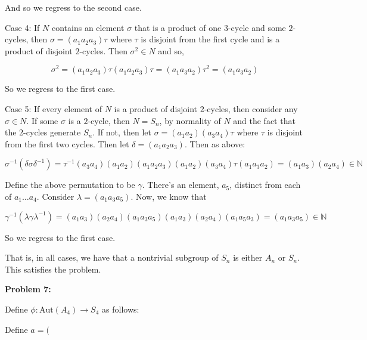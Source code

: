 \documentclass[a4paper,12pt]{article}
\newcommand{\tab}{\hspace{4mm}} %
\newcommand{\shunt}{\vspace{20mm}}
\newcommand{\ga}{\gamma}
\newcommand{\de}{\delta}
\newcommand{\la}{\lambda}
\newcommand{\si}{\sigma}
\newcommand{\N}{\mathbb{N}}
\begin{document}
\tab And so we regress to the second case.

\tab Case 4: If $N$ contains an element $\sigma$ that is a product of one $3$-cycle and some $2$-cycles, then $\sigma = (a_1a_2a_3)\tau$ where $\tau$ is disjoint from the first cycle and is a product of disjoint $2$-cycles. Then $\sigma ^2 \in N$ and so,

\begin{displaymath}
\si^2 =  (a_1a_2a_3)\tau(a_1a_2a_3)\tau = (a_1a_3a_2)\tau^2 = (a_1a_3a_2)
\end{displaymath}

\tab So we regress to the first case.

\tab Case 5: If every element of $N$ is a product of disjoint $2$-cycles, then consider any $\si \in N$. If some $\si$ is a $2$-cycle, then $N = S_n$, by normality of $N$ and the fact that the $2$-cycles generate $S_n$. If not, then let $\si = (a_1a_2)(a_3a_4)\tau$ where $\tau$ is disjoint from the first two cycles. Then let $\de = (a_1a_2a_3)$. Then as above:

\begin{displaymath}
\sigma^{-1}(\de \sigma \de^{-1}) = \tau^{-1}(a_3a_4)(a_1a_2)(a_1a_2a_3)(a_1a_2)(a_3a_4)\tau(a_1a_3a_2)=(a_1a_3)(a_2a_4) \in \N
\end{displaymath}

\tab Define the above permutation to be $\ga$. There's an element, $a_5$, distinct from each of $a_1 \ldots a_4$. Consider $\la = (a_1a_3a_5)$. Now, we know that 

\begin{displaymath}
\ga^{-1}(\la \ga \la^{-1}) = (a_1a_3)(a_2a_4)(a_1a_3a_5)(a_1a_3)(a_2a_4)(a_1a_5a_3) = (a_1a_3a_5) \in \N
\end{displaymath}

\tab So we regress to the first case.

That is, in all cases, we have that a nontrivial subgroup of $S_n$ is either $A_n$ or $S_n$. This satisfies the problem.

\shunt

{\bf Problem 7:}

Define $\phi: \text{Aut}(A_4) \to S_4$ as follows:

Define $a = ($

\shunt
\end{document}
